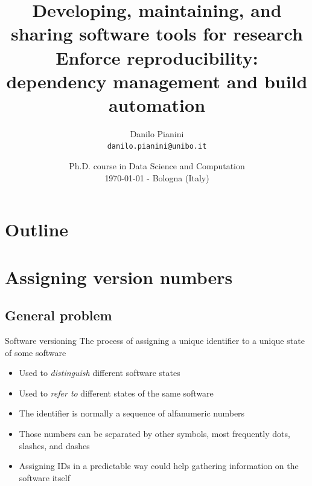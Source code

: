 \documentclass[presentation]{beamer}
\title[03 - Dependency Management]{\small{Developing, maintaining, and sharing software tools for research} \\
\normalsize{Enforce reproducibility: dependency management and build automation}}
\author[D. Pianini]{
Danilo Pianini\\
\texttt{{\footnotesize danilo.pianini@unibo.it}}}
\institute[UniBo]
{\textsc{Alma Mater Studiorum}---Universit\`a di Bologna}
\date[\today{}]{Ph.D. course in Data Science and Computation \\
\scriptsize \today{} - Bologna (Italy)
}
\begin{document}

\frame[label=coverpage]{\titlepage}

\section*{Outline}

\frame{\tableofcontents}



\section{Assigning version numbers}

\subsection{General problem}

\begin{frame}{Software versioning}
    The process of assigning a unique identifier to a unique state of some software
    \begin{itemize}
        \item Used to \textit{distinguish} different software states
        \item Used to \textit{refer to} different states of the same software
        \item The identifier is normally a sequence of alfanumeric numbers
        \item Those numbers can be separated by other symbols, most frequently dots, slashes, and dashes
        \item Assigning IDs in a predictable way could help gathering information on the software itself
    \end{itemize}
\end{frame}
\end{document}
